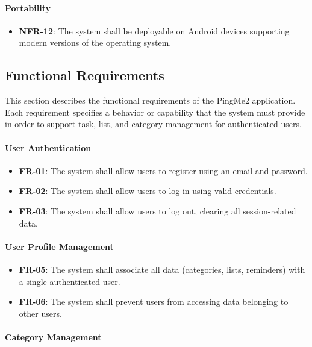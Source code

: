 \documentclass[runningheads,a4paper]{llncs}
\begin{document}
\paragraph{Portability}

\begin{itemize}
  \item \textbf{NFR-12}: The system shall be deployable on Android devices supporting modern versions of the operating system.
\end{itemize}

\subsection{Functional Requirements}
This section describes the functional requirements of the PingMe2
application. Each requirement specifies a behavior or capability that
the system must provide in order to support task, list, and category
management for authenticated users.

\paragraph{User Authentication}

\begin{itemize}
  \item \textbf{FR-01}: The system shall allow users to register using an email and password.
  \item \textbf{FR-02}: The system shall allow users to log in using valid credentials.
  \item \textbf{FR-03}: The system shall allow users to log out, clearing all session-related data.
\end{itemize}

\paragraph{User Profile Management}

\begin{itemize}
  \item \textbf{FR-05}: The system shall associate all data (categories, lists, reminders) with a single authenticated user.
  \item \textbf{FR-06}: The system shall prevent users from accessing data belonging to other users.
\end{itemize}

\paragraph{Category Management}
\end{document}
